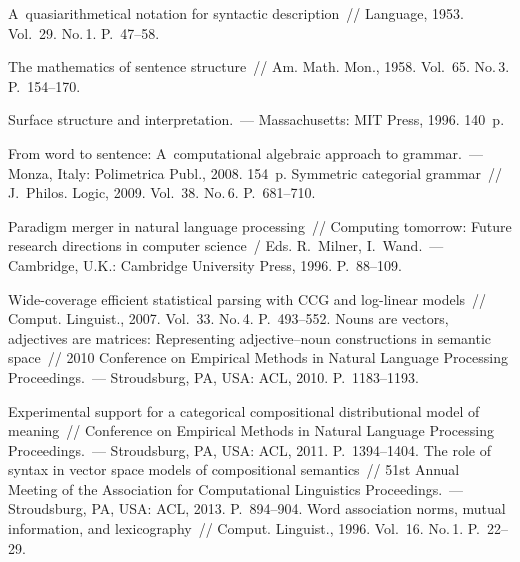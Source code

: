 \begin{multicols}{2}
{{\begin{thebibliography}{99}
   A~quasiarithmetical notation for syntactic description~// Language, 1953. 
Vol.~29. No.\,1. P.~47--58. 

   The mathematics of sentence structure~// Am. Math. Mon., 
1958. Vol.~65. No.\,3. P.~154--170.

   Surface structure and interpretation.~--- Massachusetts: MIT Press, 1996. 140~p.


   From word to sentence: A~computational algebraic approach to 
  grammar.~--- Monza, Italy: Polimetrica Publ., 2008. 154~p.
   Symmetric categorial grammar~// J.~Philos. Logic, 2009. Vol.~38. 
No.\,6. P.~681--710. 

   Paradigm merger in natural language processing~// Computing tomorrow: 
Future research directions in computer science~/ Eds. R.~Milner, I.~Wand.~--- Cambridge, U.K.: 
Cambridge University Press, 1996. P.~88--109.

   Wide-coverage efficient statistical parsing with CCG and 
  log-linear models~// Comput. Linguist., 2007. Vol.~33. No.\,4. P.~493--552.
   Nouns are vectors, adjectives are matrices: Representing 
adjective--noun constructions in semantic space~// 2010 Conference on Empirical Methods in 
Natural Language Processing Proceedings.~--- Stroudsburg, PA, USA: ACL, 2010. 
  P.~1183--1193.

   Experimental support for a categorical compositional 
distributional model of meaning~// Conference on Empirical Methods in Natural Language 
Processing Proceedings.~--- Stroudsburg, PA, 
USA: ACL, 2011. P.~1394--1404. 
   The role of syntax in vector space models of 
compositional semantics~// 51st Annual Meeting of the Association for Computational 
Linguistics Proceedings.~--- Stroudsburg, PA, USA: ACL, 2013. P.~894--904.
   Word association norms, mutual information, and lexicography~// 
Comput. Linguist., 1996. Vol.~16. No.\,1. P.~22--29.
  
\end{thebibliography}
} }

\end{multicols}

